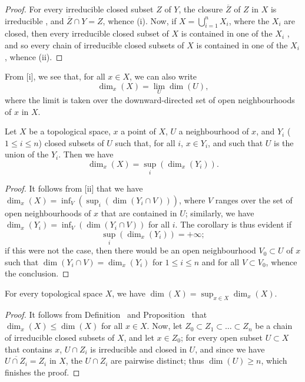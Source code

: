 \begin{proof}
For every irreducible closed subset $Z$ of $Y$, the closure $\overline{Z}$ of $Z$ in $X$ is irreducible , and $\overline{Z}\cap Y=Z$, whence (i).
Now, if $X=\bigcup_{i=1}^nX_i$, where the $X_i$ are closed, then every irreducible closed subset of $X$ is contained in one of the $X_i$ , and so every chain of irreducible closed subsets of $X$ is contained in one of the $X_i$, whence (ii).
\end{proof}

From [i], we see that, for all $x\in X$, we can also write
\[
\label{0.14.1.4.1}
  \dim_x(X)=\lim_U\dim(U),
  \tag{14.1.4.1}
\]
where the limit is taken over the downward-directed set of open neighbourhoods of $x$ in $X$.

\begin{corollary}[14.1.5]
\label{0.14.1.5}
Let $X$ be a topological space, $x$ a point of $X$, $U$ a neighbourhood of $x$, and $Y_i$ ($1\leq i\leq n$) closed subsets of $U$ such that, for all $i$, $x\in Y_i$, and such that $U$ is the union of the $Y_i$.
Then we have
\[
\label{0.14.1.5.1}
  \dim_x(X)=\sup_i(\dim_x(Y_i)).
  \tag{14.1.5.1}
\]
\end{corollary}

\begin{proof}
It follows from [ii] that we have $\dim_x(X) = \inf_V(\sup_i(\dim(Y_i\cap V)))$, where $V$ ranges over the set of open neighbourhoods of $x$ that are contained in $U$;
similarly, we have $\dim_x(Y_i) = \inf_V(\dim(Y_i\cap V))$ for all $i$.
The corollary is thus evident if
\[
  \sup_i(\dim_x(Y_i))=+\infty;
\]
if this were not the case, then there would be an open neighbourhood $V_0\subset U$ of $x$ such that $\dim(Y_i\cap V)=\dim_x(Y_i)$ for $1\leq i\leq n$ and for all $V\subset V_0$, whence the conclusion.
\end{proof}

\begin{proposition}[14.1.6]
\label{0.14.1.6}
For every topological space $X$, we have $\dim(X)=\sup_{x\in X}\dim_x(X)$.
\end{proposition}

\begin{proof}
It follows from Definition~ and Proposition~ that $\dim_x(X)\leq\dim(X)$ for all $x\in X$.
Now, let $Z_0\subset Z_1\subset\ldots\subset Z_n$ be a chain of irreducible closed subsets of $X$, and let $x\in Z_0$;
for every open subset $U\subset X$ that contains $x$, $U\cap Z_i$ is irreducible  and closed in $U$, and since we have $\overline{U\cap Z_i}=Z_i$ in $X$, the $U\cap Z_i$ are pairwise distinct;
thus $\dim(U)\geq n$, which finishes the proof.
\end{proof}

